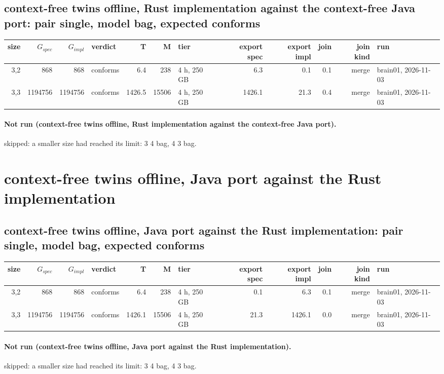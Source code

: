 \documentclass[10pt]{article}
\begin{document}
\subsection*{context-free twins offline, Rust implementation against the context-free Java port: pair \textsf{single}, model bag, expected conforms}
\begin{longtable}{@{}rrrlrrlrrrrl@{}}
\toprule
size & $G_{\mathit{spec}}$ & $G_{\mathit{impl}}$ & verdict & T & M & tier & export spec & export impl & join & join kind & run \\
\midrule
\endhead
\color{blue} 3,2 & 868 & 868 & conforms & 6.4 & 238 & 4 h, 250 GB & 6.3 & 0.1 & 0.1 & merge & brain01, 2026-11-03 \\
\color{blue} 3,3 & 1194756 & 1194756 & conforms & 1426.5 & 15506 & 4 h, 250 GB & 1426.1 & 21.3 & 0.4 & merge & brain01, 2026-11-03 \\
\bottomrule
\end{longtable}
\paragraph{Not run (context-free twins offline, Rust implementation against the context-free Java port).}
skipped: a smaller size had reached its limit: 3 4 bag, 4 3 bag.\par
\section*{context-free twins offline, Java port against the Rust implementation}
\subsection*{context-free twins offline, Java port against the Rust implementation: pair \textsf{single}, model bag, expected conforms}
\begin{longtable}{@{}rrrlrrlrrrrl@{}}
\toprule
size & $G_{\mathit{spec}}$ & $G_{\mathit{impl}}$ & verdict & T & M & tier & export spec & export impl & join & join kind & run \\
\midrule
\endhead
\color{blue} 3,2 & 868 & 868 & conforms & 6.4 & 238 & 4 h, 250 GB & 0.1 & 6.3 & 0.1 & merge & brain01, 2026-11-03 \\
\color{blue} 3,3 & 1194756 & 1194756 & conforms & 1426.1 & 15506 & 4 h, 250 GB & 21.3 & 1426.1 & 0.0 & merge & brain01, 2026-11-03 \\
\bottomrule
\end{longtable}
\paragraph{Not run (context-free twins offline, Java port against the Rust implementation).}
skipped: a smaller size had reached its limit: 3 4 bag, 4 3 bag.\par
\end{document}
